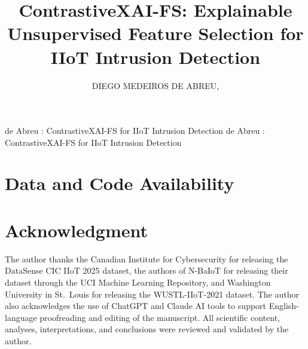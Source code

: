 \documentclass{ieeeaccess}
\newcommand{\rev}[1]{{\color{revc}#1}}
\newcommand{\rev}[1]{#1}
\begin{document}

\title{ContrastiveXAI-FS: Explainable Unsupervised Feature Selection for IIoT Intrusion Detection}
\author{\uppercase{Diego Medeiros de Abreu}, }

\address[1]{Graduate Program in Computer Science (PPGCC), Federal University of Par\'a (UFPA), Bel\'em, PA 66075-110, Brazil}
\address[2]{National Education and Research Network (RNP), Brazil}

\markboth
{de Abreu \headeretal: ContrastiveXAI-FS for IIoT Intrusion Detection}
{de Abreu \headeretal: ContrastiveXAI-FS for IIoT Intrusion Detection}




\titlepgskip=-21pt

\maketitle










\section*{Data and Code Availability}


\section*{Acknowledgment}
The author thanks the Canadian Institute for Cybersecurity for releasing the DataSense CIC IIoT 2025 dataset\rev{, the authors of N-BaIoT for releasing their dataset through the UCI Machine Learning Repository, and Washington University in St.~Louis for releasing the WUSTL-IIoT-2021 dataset}. The author also acknowledges the use of ChatGPT and Claude AI tools to support English-language proofreading and editing of the manuscript. All scientific content, analyses, interpretations, and conclusions were reviewed and validated by the author.
\end{document}
